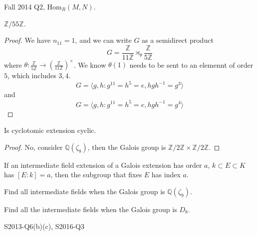 \documentclass[openany]{book}
\newcommand{\Z}{\mathbb{Z}}
\newcommand{\la}{\langle}
\newcommand{\ra}{\rangle}
\newcommand{\Q}{\mathbb{Q}}
\begin{document}
\begin{prob}
    Fall 2014 Q2, $\text{Hom}_R(M,N)$.
\end{prob}





\begin{prob}
    $\Z/55\Z$.
\end{prob}
\begin{proof}
    We have $n_{11}=1$, and we can write $G$ as a semidirect product 
    \begin{equation*}
        G=\frac{\Z}{11\Z}\rtimes_\theta \frac{\Z}{5\Z}
    \end{equation*}
    where $\theta: \frac{\Z}{5\Z}\to\left(\frac{\Z}{11\Z}\right)^\times$. We know $\theta(1)$ needs to be sent to an elemennt of order $5$, which includes $3,4$.
    \begin{equation*}
        G=\la g,h: g^{11}=h^5=e, hgh^{-1}=g^3\ra
    \end{equation*}
    and 
    \begin{equation*}
        G=\la g,h: g^{11}=h^5=e, hgh^{-1}=g^4\ra
    \end{equation*}

\end{proof}


\begin{prob}
    Is cyclotomic extension cyclic.
\end{prob}
\begin{proof}
    No, consider $\Q(\zeta_8)$, then the Galois group is $\Z/2\Z\times\Z/2\Z$.
\end{proof}

\begin{prob}
    If an intermediate field extension of a Galois extension has order $a$, $k\subset E\subset K$ has $[E:k]=a$, then the subgroup that fixes $E$ has index $a$. 
\end{prob}

\begin{prob}
    Find all intermediate fields when the Galois group is $\Q(\zeta_9)$.
\end{prob}

\begin{prob}
    Find all the intermediate fields when the Galois group is $D_8$.
\end{prob}



\begin{prob}
    S2013-Q6(b)(c), S2016-Q3
\end{prob}
\end{document}
